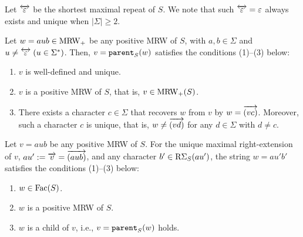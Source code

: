 Let $\mext{\eps}$ be the shortest maximal repeat of $S$. We note that such $\mext{\eps} = \eps$ always exists and unique when $|\Sigma| \ge 2$. 

\begin{lemma}
  \label{lem:posmrw:parent}
  Let $w = aub \in \MRW_+$ be any positive MRW of $S$, with $a, b \in \Sigma$ and $u\not= \mext{\eps} \;(u\in\Sigma^*)$. Then, $v = \op{parent}_{S}(w)$ satisfies the conditions (1)--(3) below: 
\begin{enumerate}[(1)]
\item $v$ is well-defined and unique.
  
\item $v$ is a positive MRW of $S$, that is, $v \in \MRW_+(S)$.
  
  
\item \label{item:posmrw:parent:three}
  There exists a character $c \in \Sigma$ that recovers $w$ from $v$ by $w = \rext{(vc)}$. Moreover, such a character $c$ is unique, that is, $w \not= \rext{(vd)}$ for any $d \in \Sigma$ with $d\not= c$. 
\end{enumerate}
\end{lemma}


\begin{lemma}
  \label{lem:posmrw:child}
  Let $v = aub$ be any positive MRW of $S$.
  For the unique maximal right-extension of $v$, $au' := \rext{v} = \rext{(aub)}$, and any character $b' \in \RSigma[S](au')$, the string $w = a u' b'$ satisfies the conditions (1)--(3) below: 
  \begin{enumerate}[(1)]
  \item $w \in \Fac(S)$. 
  \item $w$ is a positive MRW of $S$.
  \item $w$ is a child of $v$, i.e., $v = \op{parent}_S(w)$ holds. 
  \end{enumerate}
\end{lemma}




